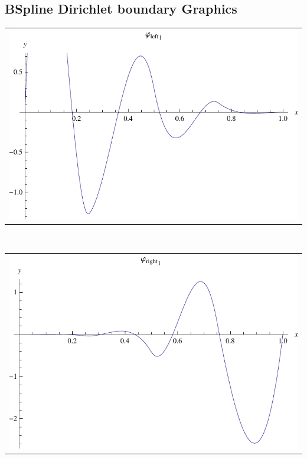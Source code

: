 \documentclass{article}
\begin{document}
\begin{landscape}
\subsection{BSpline Dirichlet boundary Graphics}
\begin{tabular}{c}
\includegraphics[width=20.cm]{cubic_bspline_dleft_1.pdf}\end{tabular} 
 \\ 
\begin{tabular}{c}
\includegraphics[width=20.cm]{cubic_bspline_dright_1.pdf}\end{tabular} 
 \end{landscape}
\end{document}
